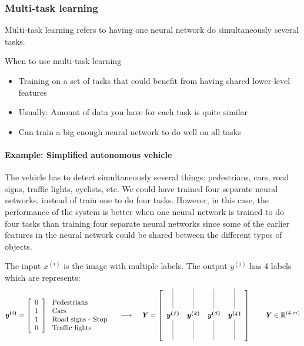 \documentclass[UTF8]{article}
\newcommand{\Vector}[1]{\boldsymbol{\mathit{#1}}}   %
\newcommand{\Matrix}[1]{\boldsymbol{\mathit{#1}}}   %
\newcommand{\Set}[1]{\mathbb{#1}}                   %
\newcommand{\vRule}{\rule{0.3pt}{10mm}}             %
\begin{document}
\subsubsection{Multi-task learning}
Multi-task learning refers to having one neural network do simultaneously several tasks.

When to use multi-task learning
\begin{itemize}
    \item Training on a set of tasks that could benefit from having shared lower-level features
    \item Usually: Amount of data you have for each task is quite similar
    \item Can train a big enough neural network to do well on all tasks
\end{itemize}

\paragraph{Example: Simplified autonomous vehicle}
The vehicle has to detect simultaneously several things: pedestrians, cars, road signs, traffic
lights, cyclists, etc. We could have trained four separate neural networks, instead of train one to
do four tasks. However, in this case, the performance of the system is better when one neural
network is trained to do four tasks than training four separate neural networks since some of the
earlier features in the neural network could be shared between the different types of objects.

The input $x^{(i)}$ is the image with multiple labels. The output $y^{(i)}$ has 4 labels which are
represents:
$$ \Vector{y^{(i)}} = \left[\begin{array}{c} 0 \\ 1 \\ 1 \\ 0 \end{array}\right]
\left.\begin{array}{l}
\text{Pedestrians} \\ \text{Cars} \\ \text{Road signs - Stop} \\ \text{Traffic lights}
\end{array}\right. \quad \longrightarrow \quad
\Matrix{Y} = \left[\begin{array}{cccc}
\vRule & \vRule & \vRule & \vRule \\
\Vector{y^{(1)}} & \Vector{y^{(2)}} & \Vector{y^{(3)}} & \Vector{y^{(4)}} \\
\vRule & \vRule & \vRule & \vRule \end{array}\right] \qquad
\Matrix{Y} \in \Set{R}^{(4, m)} $$
\end{document}
